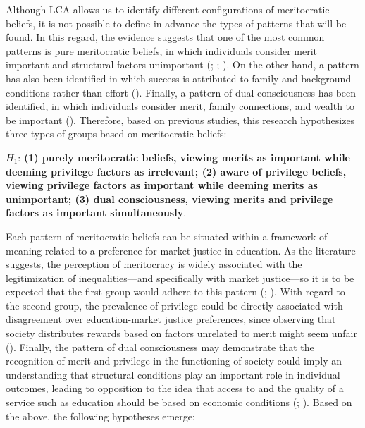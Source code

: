 \documentclass[
  spanish,
  a4paper,
  oneside]{scrbook}
\begin{document}
Although LCA allows us to identify different configurations of
meritocratic beliefs, it is not possible to define in advance the types
of patterns that will be found. In this regard, the evidence suggests
that one of the most common patterns is pure meritocratic beliefs, in
which individuals consider merit important and structural factors
unimportant (;
;
). On the other hand, a
pattern has also been identified in which success is attributed to
family and background conditions rather than effort
().
Finally, a pattern of dual consciousness has been identified, in which
individuals consider merit, family connections, and wealth to be
important (). Therefore,
based on previous studies, this research hypothesizes three types of
groups based on meritocratic beliefs:

\(H_{1}\): \textbf{(1) purely meritocratic beliefs, viewing merits as
important while deeming privilege factors as irrelevant; (2) aware of
privilege beliefs, viewing privilege factors as important while deeming
merits as unimportant; (3) dual consciousness, viewing merits and
privilege factors as important simultaneously}.

Each pattern of meritocratic beliefs can be situated within a framework
of meaning related to a preference for market justice in education. As
the literature suggests, the perception of meritocracy is widely
associated with the legitimization of inequalities---and specifically
with market justice---so it is to be expected that the first group would
adhere to this pattern
(; ). With regard to the second group, the prevalence of privilege
could be directly associated with disagreement over education-market
justice preferences, since observing that society distributes rewards
based on factors unrelated to merit might seem unfair
().
Finally, the pattern of dual consciousness may demonstrate that the
recognition of merit and privilege in the functioning of society could
imply an understanding that structural conditions play an important role
in individual outcomes, leading to opposition to the idea that access to
and the quality of a service such as education should be based on
economic conditions (; ). Based
on the above, the following hypotheses emerge:
\end{document}
